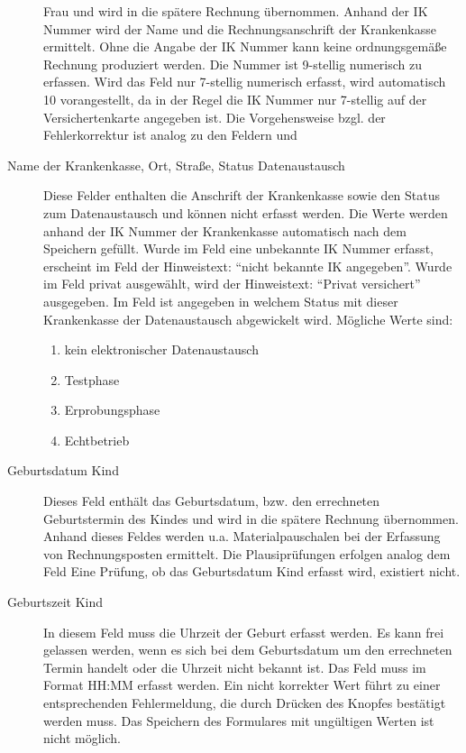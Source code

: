 \begin{description}
Frau und wird in die spätere Rechnung übernommen. Anhand der IK Nummer
wird der Name und die Rechnungsanschrift der Krankenkasse ermittelt. Ohne
die Angabe der IK Nummer kann keine ordnungsgemäße Rechnung produziert werden.
Die Nummer ist 9-stellig numerisch zu erfassen. Wird das Feld nur 7-stellig
numerisch erfasst, wird automatisch 10 vorangestellt, da in der Regel
die IK Nummer nur 7-stellig auf der Versichertenkarte angegeben ist.
Die Vorgehensweise bzgl.
der Fehlerkorrektur ist analog zu den Feldern  und 
\item[Name der Krankenkasse, Ort, Straße, Status Datenaustausch] 
Diese Felder enthalten die 
Anschrift der Krankenkasse sowie den Status zum Datenaustausch
und können nicht erfasst werden. Die Werte werden
anhand der IK Nummer der Krankenkasse automatisch nach dem Speichern
gefüllt. Wurde im Feld  eine unbekannte IK Nummer
erfasst, erscheint im Feld  der Hinweistext:
``nicht bekannte IK angegeben''. Wurde im Feld  privat
ausgewählt, wird der Hinweistext: ``Privat versichert'' ausgegeben.
Im Feld  ist angegeben in welchem Status mit dieser
Krankenkasse der Datenaustausch abgewickelt wird. Mögliche Werte sind:
\begin{enumerate}
\item 
kein elektronischer Datenaustausch
\item 
Testphase
\item
Erprobungsphase
\item
Echtbetrieb
\end{enumerate}
\item[Geburtsdatum Kind] Dieses Feld enthält das Geburtsdatum, bzw. den
errechneten Geburtstermin des Kindes und wird in die spätere Rechnung 
übernommen. 
Anhand dieses Feldes werden u.a.
Materialpauschalen bei der Erfassung von Rechnungsposten ermittelt.
Die Plausiprüfungen erfolgen analog dem Feld  Eine Prüfung,
ob das Geburtsdatum Kind erfasst wird, existiert nicht.
\item[Geburtszeit Kind]
In diesem Feld muss die Uhrzeit der Geburt erfasst werden. Es kann frei
gelassen werden, wenn es sich bei dem Geburtsdatum um den errechneten
Termin handelt oder die Uhrzeit nicht bekannt ist. 
Das Feld muss im Format HH:MM erfasst werden.
Ein nicht korrekter Wert führt zu einer entsprechenden Fehlermeldung,
die durch Drücken des Knopfes  bestätigt werden muss.
Das Speichern des Formulares mit ungültigen Werten ist nicht möglich.

\end{description}

